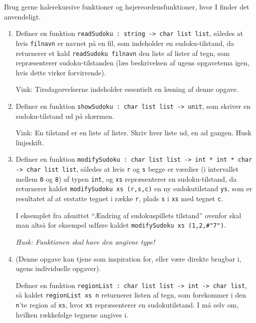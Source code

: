 \documentclass[a4paper]{article}
\begin{document}
Brug gerne halerekursive funktioner og h{\o}jereordensfunktioner, hvor I finder det anvendeligt.


\begin{enumerate}[{6}G1]

\item{Definer en funktion \texttt{readSudoku :\ string -> char list list},
s{\aa}ledes at hvis \texttt{filnavn} er navnet p{\aa} en fil, som indeholder
en sudoku-tilstand, da returnerer et kald \texttt{readSudoku filnavn}
den liste af lister af tegn, som repr{\ae}senterer sudoku-tilstanden
(l{\ae}s beskrivelsen af ugens opgavetema igen, hvis dette virker forvirrende).

Vink: Tirsdags{\o}velserne indeholder essentielt en l{\o}sning af denne opgave.}

\item{Definer en funktion \texttt{showSudoku :\ char list list -> unit},
som skriver en sudoku-tilstand ud p{\aa} sk{\ae}rmen.

Vink: En tilstand er en liste af lister. Skriv hver liste ud, en ad gangen. Husk linjeskift.}

\item{Definer en funktion
\texttt{modifySudoku :\ char list list -> int * int * char -> char list list},
s{\aa}\-le\-des at hvis \texttt{r} og \texttt{s}
begge er v{\ae}rdier (i intervallet mellem \texttt0 og \texttt8) af typen \texttt{int},
og \texttt{xs} repr{\ae}senterer en sudoku-tilstand,
da returnerer kaldet \texttt{modifySudoku xs (r,s,c)} en ny sudokutilstand
\texttt{ys}, som er resultatet af at erstatte tegnet i r{\ae}kke \texttt{r},
plads \texttt{s} i \texttt{xs} med tegnet \texttt{c}.

I eksemplet fra afsnittet ``{\AE}ndring af sudokuspillets tilstand'' ovenfor
skal man alts{\aa} for eksempel udf{\o}re kaldet \texttt{modifySudoku xs (1,2,\#"7")}.


\emph{Husk: Funktionen skal have den angivne type!}}

\item{(Denne opgave kan tjene som inspiration for, eller v{\ae}re direkte brugbar i,
ugens individuelle opgaver).

Definer en funktion \texttt{regionList :\ char list list -> int -> char list}, s{\aa}
kaldet\newline
\texttt{regionList xs n} returnerer listen af tegn, som forekommer
i den \texttt{n}'te region af \texttt{xs}, hvor \texttt{xs} repr{\ae}senterer
en sudokutilstand. I m{\aa} selv om, hvilken r{\ae}kkef{\o}lge tegnene angives i.

}
\end{enumerate}
\end{document}
